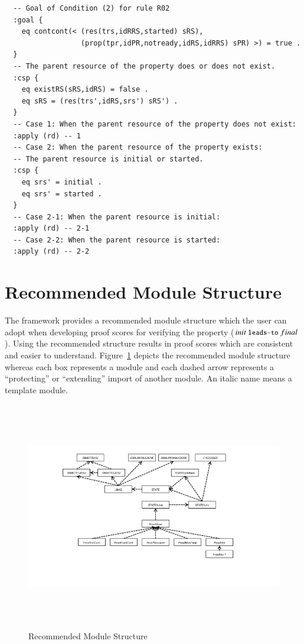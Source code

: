 \documentclass[12pt]{report}
\newcommand{\mbstt}[1]{\mbox{\small{\tt {#1}}}}
\begin{document}
\small
\begin{verbatim}
  -- Goal of Condition (2) for rule R02
  :goal {
    eq contcont(< (res(trs,idRRS,started) sRS),
                  (prop(tpr,idPR,notready,idRS,idRRS) sPR) >) = true .
  }
  -- The parent resource of the property does or does not exist.
  :csp {
    eq existRS(sRS,idRS) = false .
    eq sRS = (res(trs',idRS,srs') sRS') .
  }
  -- Case 1: When the parent resource of the property does not exist:
  :apply (rd) -- 1
  -- Case 2: When the parent resource of the property exists:
  -- The parent resource is initial or started.
  :csp {
    eq srs' = initial .
    eq srs' = started .
  }
  -- Case 2-1: When the parent resource is initial:
  :apply (rd) -- 2-1
  -- Case 2-2: When the parent resource is started:
  :apply (rd) -- 2-2
\end{verbatim}
\normalsize

\section{Recommended Module Structure}
The framework provides a recommended module structure which the user
can adopt when developing proof scores for verifying the property
($init~\mbstt{leads-to}~final$). Using the recommended structure
results in proof scores which are consistent and easier to understand.
Figure~\ref{fig:modules} depicts the recommended module structure
whereas each box represents a module and each dashed arrow represents
a ``protecting'' or ``extending'' import of another module. An italic
name means a template module.

\begin{figure}
\centering
\includegraphics[height=10cm,natwidth=720,natheight=405,clip,trim=90 80 130 20]{modules.png}
\caption{Recommended Module Structure}
\label{fig:modules}
\end{figure}
\end{document}
